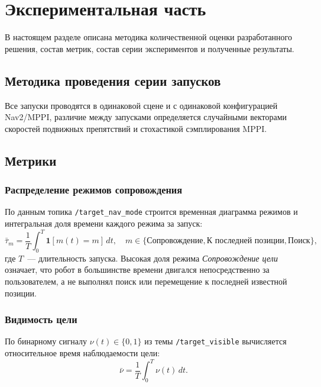 \section{Экспериментальная часть}
\label{sec:experiments}

В настоящем разделе описана методика количественной оценки
разработанного решения, состав метрик, состав серии экспериментов
и полученные результаты.

\subsection{Методика проведения серии запусков}

Все запуски проводятся в одинаковой сцене и с одинаковой
конфигурацией Nav2/MPPI, различие между запусками определяется
случайными векторами скоростей подвижных препятствий и стохастикой
сэмплирования MPPI.

\subsection{Метрики}
\subsubsection{Распределение режимов сопровождения}

По данным топика \texttt{/target\_nav\_mode} строится временная диаграмма
режимов и интегральная доля времени каждого режима за запуск:
\begin{equation}
\bar{\tau}_m = \frac{1}{T} \int_{0}^{T} \mathbf{1}[m(t) = m]\,dt,
\quad m \in \{\text{Сопровождение}, \text{К~последней позиции},
\text{Поиск}\},
\label{eq:metric_modes}
\end{equation}
где $T$~--- длительность запуска. Высокая доля режима
\textit{Сопровождение цели} означает, что робот в большинстве
времени двигался непосредственно за пользователем, а не выполнял
поиск или перемещение к последней известной позиции.

\subsubsection{Видимость цели}

По бинарному сигналу $\nu(t) \in \{0,1\}$ из темы
\texttt{/target\_visible} вычисляется относительное время
наблюдаемости цели:
\begin{equation}
\bar{\nu} = \frac{1}{T} \int_{0}^{T} \nu(t)\,dt.
\label{eq:metric_visibility}
\end{equation}


